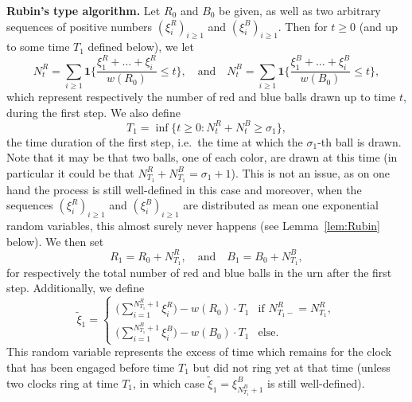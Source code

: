 \documentclass[11pt]{article}
\newcommand{\1}{{\text{\Large $\mathfrak 1$}}}
\begin{document}
\vspace{0.2cm}
\noindent \textbf{Rubin's type algorithm.} 
Let $R_0$ and $B_0$ be given, as well as two arbitrary sequences of positive numbers $(\xi_i^R)_{i\ge 1}$ and $(\xi_i^B)_{i\ge 1}$. Then for $t\ge 0$ (and up to some time $T_1$ defined below), we let  
$$N_t^R = \sum_{i\ge 1} \mathbf 1\big\{\frac{\xi_1^R + \dots + \xi_i^R}{w(R_0)} \le t\big\}, \quad \text{and}\quad N_t^B = \sum_{i\ge 1} \mathbf 1\big\{\frac{\xi_1^B + \dots + \xi_i^B}{w(B_0)} \le t\big\},$$
which represent respectively the number of red and blue balls drawn up to time $t$, during the first step.  
We also define  
$$T_1 = \inf \{t\ge 0 : N_t^R + N_t^B\ge  \sigma_1\},$$
the time duration of the first step, i.e.~the time at which the $\sigma_1$-th ball is drawn. 
Note that it may be that two balls, one of each color, are drawn at this time (in particular it could be that $N_{T_1}^R + N_{T_1}^B =\sigma_1 +1$). This is not an issue, as on one hand the process is still well-defined in this case and moreover, when the sequences $(\xi_i^R)_{i\ge 1}$ and $(\xi_i^B)_{i\ge 1}$ are distributed as mean one exponential random variables, this almost surely never happens (see Lemma~\ref{lem:Rubin} below). We then set 
$$R_1 = R_0 + N_{T_1}^R, \quad  \text{and} \quad B_1 =B_0 +  N_{T_1}^B,$$
for respectively the total number of red and blue balls in the urn after the first step. 
Additionally, we define
\begin{equation}
\widetilde \xi_1 =\left\{ 
\begin{array}{ll}
\Big( \sum_{i=1}^{N_{T_1}^R+1} \xi_i^R\Big) - w(R_0)\cdot T_1 & \text{if } N_{T_1-}^R=N_{T_1}^R,\\
\Big( \sum_{i=1}^{N_{T_1}^B+1} \xi_i^B\Big) - w(B_0)\cdot T_1 & \text{else}.
\end{array}
\right. 
\end{equation}
This random variable represents the excess of time which remains for the clock that has been engaged before time $T_1$ but did not ring yet at that time (unless two clocks ring at time $T_1$, in which case $\widetilde \xi_1=\xi^B_{N_{T_1}^B +1}$ is still well-defined). 
\end{document}
